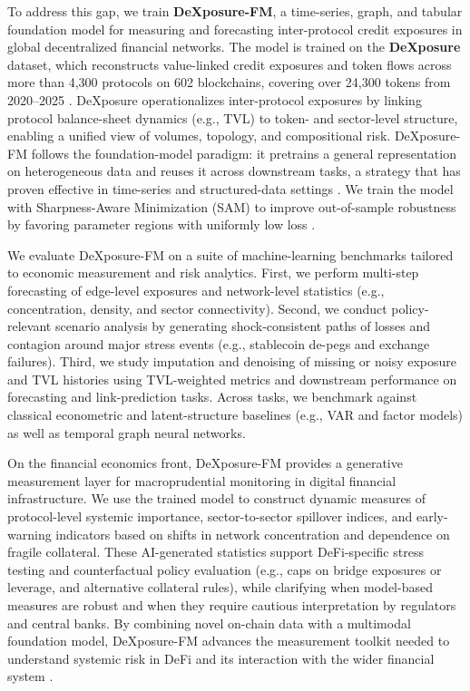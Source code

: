 To address this gap, we train \textbf{DeXposure-FM}, a time-series, graph, and tabular foundation model for measuring and forecasting inter-protocol credit exposures in global decentralized financial networks. The model is trained on the \textbf{DeXposure} dataset, which reconstructs value-linked credit exposures and token flows across more than 4,300 protocols on 602 blockchains, covering over 24,300 tokens from 2020--2025 \cite{Wu2025}. DeXposure operationalizes inter-protocol exposures by linking protocol balance-sheet dynamics (e.g., TVL) to token- and sector-level structure, enabling a unified view of volumes, topology, and compositional risk. DeXposure-FM follows the foundation-model paradigm: it pretrains a general representation on heterogeneous data and reuses it across downstream tasks, a strategy that has proven effective in time-series and structured-data settings \cite{liang2024fmts,eremeev2025g2tfm}. We train the model with Sharpness-Aware Minimization (SAM) to improve out-of-sample robustness by favoring parameter regions with uniformly low loss \cite{oikonomou2025sam}.

We evaluate DeXposure-FM on a suite of machine-learning benchmarks tailored to economic measurement and risk analytics. First, we perform multi-step forecasting of edge-level exposures and network-level statistics (e.g., concentration, density, and sector connectivity). Second, we conduct policy-relevant scenario analysis by generating shock-consistent paths of losses and contagion around major stress events (e.g., stablecoin de-pegs and exchange failures). Third, we study imputation and denoising of missing or noisy exposure and TVL histories using TVL-weighted metrics and downstream performance on forecasting and link-prediction tasks. Across tasks, we benchmark against classical econometric and latent-structure baselines (e.g., VAR and factor models) as well as temporal graph neural networks. %

On the financial economics front, DeXposure-FM provides a generative measurement layer for macroprudential monitoring in digital financial infrastructure. We use the trained model to construct dynamic measures of protocol-level systemic importance, sector-to-sector spillover indices, and early-warning indicators based on shifts in network concentration and dependence on fragile collateral. These AI-generated statistics support DeFi-specific stress testing and counterfactual policy evaluation (e.g., caps on bridge exposures or leverage, and alternative collateral rules), while clarifying when model-based measures are robust and when they require cautious interpretation by regulators and central banks. %
By combining novel on-chain data with a multimodal foundation model, DeXposure-FM advances the measurement toolkit needed to understand systemic risk in DeFi and its interaction with the wider financial system \cite{naifar2025mapping,aufiero2025mapping}.